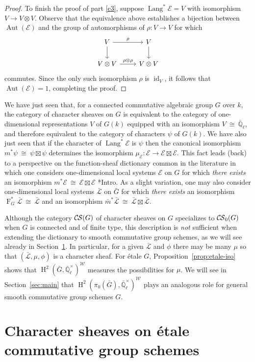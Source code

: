 \documentclass[10pt]{amsart}
\theoremstyle{plain}
\theoremstyle{definition}
\theoremstyle{remark}
\newcommand{\EE}{\mathbb{\bar Q}_\ell}
\newcommand{\Fq}{k}
\newcommand{\EEx}{\EE^\times}
\newcommand{\Weil}[1]{\mathcal{W}_{#1}}
\newcommand{\Frob}[1]{\operatorname{F}_{#1}}
\DeclareMathOperator{\Aut}{Aut}
\DeclareMathOperator{\id}{id}
\DeclareMathOperator{\Hh}{H}
\DeclareMathOperator{\Lang}{Lang}
\newcommand{\iso}{{\ \cong\ }}
\newcommand{\cs}[1]{{\mathcal{#1}}}
\newcommand{\gcs}[1]{{\mathcal{\bar #1}}}
\newcommand{\CS}{{\mathcal{C\hskip-0.8pt S}}}
\newcommand{\bCS}{{\CS_0}}
\newcommand{\bm}{\bar{m}}
\newcommand{\bG}{\bar{G}}
\begin{document}
\begin{proof}
To finish the proof of part \ref{c3}, suppose $\Lang^*\cs{E} = V$ with isomorphism $V \to V\otimes V$.  Observe that the equivalence above establishes a bijection between $\Aut(\cs{E})$ and the group of automorphisms of $\rho : V\to V$ for which 
\[
\begin{tikzcd}
\arrow{d}{} V \arrow{r}{\rho} & V\arrow{d}{}\\
V\otimes V \arrow{r}{\rho\otimes \rho} & V\otimes V
\end{tikzcd}
\]
commutes. 
Since the only such isomorphism $\rho$ is $\id_V$, it follows that $\Aut(\cs{E}) = 1$, completing the proof.
\end{proof}

We have just seen that, for a connected commutative algebraic group $G$ over $\Fq$, the category of character sheaves on $G$ is equivalent to the category of one-dimensional representations $V$ of $G(\Fq)$ equipped with an isomorphism $V\iso \EE$, and therefore equivalent to the category of characters $\psi$ of $G(\Fq)$.
We have also just seen that if the character of $\Lang^*\cs{E}$ is $\psi$ then the canonical isomorphism $m^*\psi \iso \psi \boxtimes \psi$ determines the isomorphism $\mu_\cs{E} : \cs{E} \to \cs{E}\boxtimes\cs{E}$.
This fact leads (back) to a perspective on the function-sheaf dictionary common in the literature in which one considers one-dimensional local systems $\cs{E}$ on $G$ for which \emph{there exists} an isomorphism $m^*\cs{E} \iso \cs{E} \boxtimes\cs{E}$ \cite{kamgarpour:09a}*{Intro}.
As a slight variation, one may also consider one-dimensional local systems $\gcs{L}$ on $\bG$ for which \emph{there exists} an isomorphism $\Frob{G}^*\gcs{L} \iso \gcs{L}$ and an isomorphism $\bm^*\gcs{L} \iso \gcs{L} \boxtimes\gcs{L}$.

Although the category $\CS(G)$ of character sheaves on $G$ specializes to $\bCS(G)$ when $G$ is connected and of finite type, this description is \emph{not} sufficient when extending the dictionary to smooth commutative group schemes, as we will see already in Section~\ref{sec:etale}.
In particular, for a given $\gcs{L}$ and $\phi$ there may be many $\mu$ so that $(\gcs{L},\mu,\phi)$ is a character sheaf.  For \'etale $G$, Proposition~\ref{prop:etale-iso} shows that $\Hh^2(\bG,\EEx)^{\Weil{}}$ measures the possibilities for $\mu$.  We will see in Section~\ref{sec:main} that $\Hh^2(\pi_0(\bG),\EEx)^{\Weil{}}$ plays an analogous role for general smooth commutative group schemes $G$.

\section{Character sheaves on \'etale commutative group schemes} \label{sec:etale}
\end{document}
